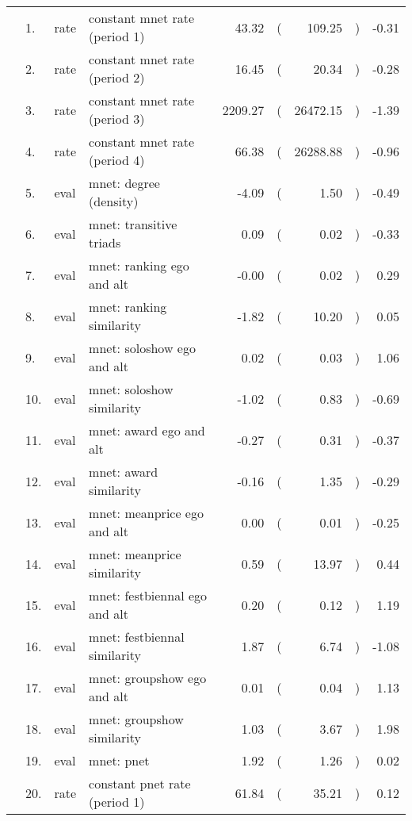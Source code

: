 \begin{table}[ht]
\centering
\begin{tabular}{llllrlrlr}
  \hline
  \hline
  &  1. & rate & constant mnet rate (period 1) & 43.32 & ( & 109.25 & ) & -0.31 \\ 
    &  2. & rate & constant mnet rate (period 2) & 16.45 & ( & 20.34 & ) & -0.28 \\ 
    &  3. & rate & constant mnet rate (period 3) & 2209.27 & ( & 26472.15 & ) & -1.39 \\ 
    &  4. & rate & constant mnet rate (period 4) & 66.38 & ( & 26288.88 & ) & -0.96 \\ 
    &  5. & eval & mnet: degree (density) & -4.09 & ( & 1.50 & ) & -0.49 \\ 
    &  6. & eval & mnet: transitive triads & 0.09 & ( & 0.02 & ) & -0.33 \\ 
    &  7. & eval & mnet: ranking ego and alt & -0.00 & ( & 0.02 & ) & 0.29 \\ 
    &  8. & eval & mnet: ranking similarity & -1.82 & ( & 10.20 & ) & 0.05 \\ 
    &  9. & eval & mnet: soloshow ego and alt & 0.02 & ( & 0.03 & ) & 1.06 \\ 
    & 10. & eval & mnet: soloshow similarity & -1.02 & ( & 0.83 & ) & -0.69 \\ 
    & 11. & eval & mnet: award ego and alt & -0.27 & ( & 0.31 & ) & -0.37 \\ 
    & 12. & eval & mnet: award similarity & -0.16 & ( & 1.35 & ) & -0.29 \\ 
    & 13. & eval & mnet: meanprice ego and alt & 0.00 & ( & 0.01 & ) & -0.25 \\ 
    & 14. & eval & mnet: meanprice similarity & 0.59 & ( & 13.97 & ) & 0.44 \\ 
    & 15. & eval & mnet: festbiennal ego and alt & 0.20 & ( & 0.12 & ) & 1.19 \\ 
    & 16. & eval & mnet: festbiennal similarity & 1.87 & ( & 6.74 & ) & -1.08 \\ 
    & 17. & eval & mnet: groupshow ego and alt & 0.01 & ( & 0.04 & ) & 1.13 \\ 
    & 18. & eval & mnet: groupshow similarity & 1.03 & ( & 3.67 & ) & 1.98 \\ 
    & 19. & eval & mnet: pnet & 1.92 & ( & 1.26 & ) & 0.02 \\ 
    & 20. & rate & constant pnet rate (period 1) & 61.84 & ( & 35.21 & ) & 0.12 \\ 

\end{tabular}
\end{table}
